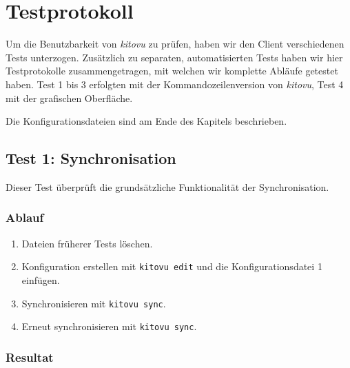 \documentclass[a4paper]{article}
\let\oldsection\section
\renewcommand\section{\clearpage\oldsection}
\begin{document}
  \section{Testprotokoll}

  Um die Benutzbarkeit von \emph{kitovu} zu prüfen, haben wir den Client verschiedenen Tests unterzogen. Zusätzlich zu separaten, automatisierten Tests haben wir hier Testprotokolle zusammengetragen, mit welchen wir komplette Abläufe getestet haben. Test 1 bis 3 erfolgten mit der Kommandozeilenversion von \emph{kitovu}, Test 4 mit der grafischen Oberfläche.

  Die Konfigurationsdateien sind am Ende des Kapitels beschrieben.

  \subsection{Test 1: Synchronisation}

  Dieser Test überprüft die grundsätzliche Funktionalität der Synchronisation.

  \subsubsection{Ablauf}

  \begin{enumerate}
    \item Dateien früherer Tests löschen.
    \item Konfiguration erstellen mit \verb|kitovu edit| und die Konfigurationsdatei 1 einfügen.
    \item Synchronisieren mit \verb|kitovu sync|.
    \item Erneut synchronisieren mit \verb|kitovu sync|.
  \end{enumerate}

  \subsubsection{Resultat}
\end{document}
